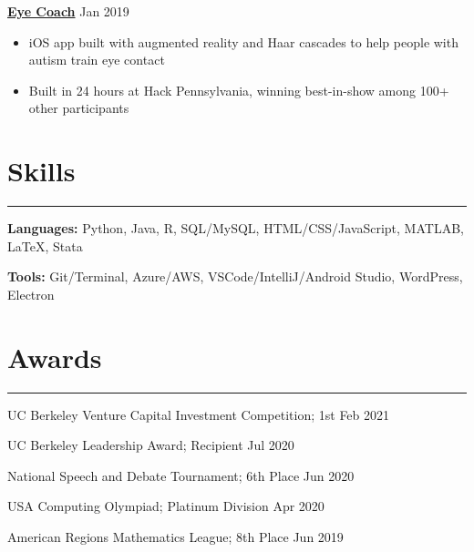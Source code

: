 \documentclass[11pt]{article}
\newcommand{\resumesection}[1]{\vspace{-0.6cm}\section*{\color{highlight}#1}\vspace{-0.3cm}\hrule\vspace{0.2cm}}
\begin{document}
\textbf{\href{https://github.com/gautomdas/eye-coach}{Eye Coach}} \hfill Jan 2019 \par
\begin{itemize}
	\item iOS app built with augmented reality and Haar cascades to help people with autism train eye contact
	\item Built in 24 hours at Hack Pennsylvania, winning best-in-show among 100+ other participants
\end{itemize}\vspace{0.1cm} \par

\resumesection{Skills}

\textbf{Languages:} Python, Java, R, SQL/MySQL, HTML/CSS/JavaScript, MATLAB, \LaTeX, Stata \par
\textbf{Tools:} Git/Terminal, Azure/AWS, VSCode/IntelliJ/Android Studio, WordPress, Electron

\resumesection{Awards}

UC Berkeley Venture Capital Investment Competition; 1st \hfill Feb 2021\par
UC Berkeley Leadership Award; Recipient \hfill Jul 2020 \par
National Speech and Debate Tournament; 6th Place \hfill Jun 2020 \par
USA Computing Olympiad; Platinum Division \hfill Apr 2020 \par
American Regions Mathematics League; 8th Place \hfill Jun 2019 \par
\end{document}
